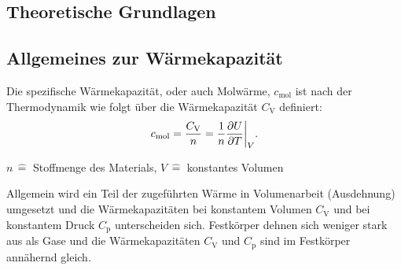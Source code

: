 \subsection{Theoretische Grundlagen}
\subsection{Allgemeines zur Wärmekapazität}
Die spezifische Wärmekapazität, oder auch Molwärme, $c_{\text{mol}}$ ist nach der Thermodynamik wie folgt über die Wärmekapazität $C_{\text{V}}$ definiert:
\begin{equation*}
	c_{\text{mol}} = \frac{C_{\text{V}}}{n} = \frac{1}{n} \frac{\partial U}{\partial T} \bigg{\vert}_{V}.
\end{equation*}
\begin{center}
	\tiny{$n \, \widehat{=}$ Stoffmenge des Materials, $V \, \widehat{=}$ konstantes Volumen }
\end{center}
Allgemein wird ein Teil der zugeführten Wärme in Volumenarbeit (Ausdehnung) umgesetzt und die Wärmekapazitäten bei konstantem Volumen $C_{\text{V}}$ und bei konstantem Druck $C_{\text{p}}$ unterscheiden sich.
Festkörper dehnen sich weniger stark aus als Gase und die Wärmekapazitäten $C_{\text{V}}$ und $C_{\text{p}}$ sind im Festkörper annähernd gleich.

